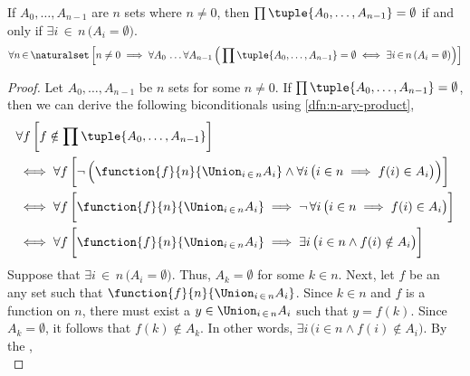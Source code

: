 \begin{thm}
    \label{thm:n-ary-product-is-empty-if-and-only-if-one-of-the-sets-is-empty}
    If \( A_{0},\dots,A_{n-1} \) are \( n \) sets where \( n \neq 0 \), then \( \prod \tuple{A_{0}, \dots, A_{n-1}} = \emptyset \)
    if and only if \( \exists i\,{\in}\,n \, \big( A_{i} = \emptyset \big) \).
    \begin{equation*}
        \forall n\,{\in}\,\naturalset \,
        \Big[ n \neq 0 \implies \forall A_{0} \, \dots \forall A_{n-1} \, \Big( \prod \tuple{A_{0}, \dots, A_{n-1}} = \emptyset \iff
        \exists i\,{\in}\,n \, \mleft( A_{i} = \emptyset \mright)\Big) \Big]
    \end{equation*}
\end{thm}

\begin{proof}
    Let \( A_{0},\dots,A_{n-1} \) be \( n \) sets for some \( n \neq 0 \). If \( \prod \tuple{A_{0}, \dots, A_{n-1}} = \emptyset \),
    then we can derive the following biconditionals using \cref{dfn:n-ary-product},
    \begin{align}
        &\forall f \, \bigg[ f \notin \prod \tuple{A_{0}, \dots, A_{n-1}} \bigg] \notag \\
        &\iff
        \forall f \, \bigg[ \lnot \, \Big( \function{f}{n}{\Union_{i \,\in\, n} A_{i}} \land \forall i \, \big( i \in n \implies f(i) \in A_{i} \big) \Big) \bigg]
        \notag \\
        &\iff
        \forall f \, \bigg[ \function{f}{n}{\Union_{i \,\in\, n} A_{i}} \implies \lnot \, \forall i \, \big( i \in n \implies f(i) \in A_{i} \big) \bigg] \notag \\
        &\iff
        \forall f \, \bigg[ \function{f}{n}{\Union_{i \,\in\, n} A_{i}} \implies \exists i \, \big( i \in n \land f(i) \notin A_{i} \big) \bigg]
        \label{eq:main-biconditional-for-empty-product}
    \end{align}
    Suppose that \( \exists i\,{\in}\,n \, \big( A_{i} = \emptyset \big) \).
    Thus, \( A_{k} = \emptyset \) for some \( k \in n \).
    Next, let \( f \) be an any set such that \( \function{f}{n}{\Union_{i \,\in\, n} A_{i}} \).
    Since \( k \in n \) and \( f \) is a function on \( n \), there must exist a \( y \in \Union_{i \,\in\, n} A_{i}\) such that \( y = f(k) \).
    Since \( A_{k} = \emptyset \), it follows that \( f(k) \notin A_{k} \). In other words, \( \exists i \, \big( i \in n \land f(i) \notin A_{i} \big) \).
    By the ,
    \begin{equation*}

\end{equation*}
\end{proof}
